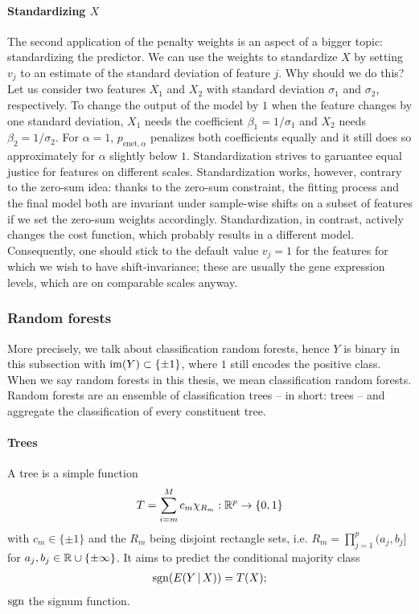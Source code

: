 \paragraph{Standardizing $X$} 
The second application of the penalty weights is an aspect of a bigger topic: standardizing the
predictor. We can use the weights to standardize $X$ by setting $v_j$ to an estimate of the standard 
deviation of feature $j$. Why 
should we do this? Let us consider two features $X_1$ and $X_2$ with standard deviation $\sigma_1$
and $\sigma_2$, respectively. To change the output of the model by $1$ when the feature changes by 
one standard deviation, $X_1$ needs the coefficient $\beta_1 = 1/\sigma_1$ and $X_2$ needs 
$\beta_2 = 1/\sigma_2$. For $\alpha = 1$, $p_{\text{enet}, \alpha}$ penalizes both coefficients 
equally and it still does so approximately for $\alpha$ slightly below $1$. Standardization strives 
to garuantee equal justice for features on different scales.
Standardization works, however, contrary to the zero-sum idea: thanks to the zero-sum constraint, 
the fitting process and the final model both are invariant under sample-wise shifts on a subset of 
features if we set the zero-sum weights accordingly. Standardization, in contrast, actively changes 
the cost function, which probably results in a different model. Consequently, one should stick to 
the default value $v_j = 1$ for the features for which we wish to have shift-invariance; these 
are usually the gene expression levels, which are on comparable scales anyway.

\subsubsection{Random forests}

More precisely, we talk about classification random forests, hence $Y$ is binary in this subsection 
with $\mathrm{im}(Y) \subset \{ \pm 1 \}$, where $1$ still encodes the positive class. When we say random 
forests in this thesis, we mean classification 
random forests. Random forests are an ensemble of classification trees -- in short: 
trees -- and aggregate the classification of every constituent tree.

\paragraph{Trees}
A tree is a simple function
\begin{align}
    T = \sum_{i=m}^M c_m \chi_{R_m}: \mathbb{R}^p \to \{0, 1\}
\end{align}
with $c_m \in \{\pm 1\}$ and the $R_m$ being disjoint rectangle sets, i.e. $R_m = \prod_{j=1}^p 
(a_j, b_j]$ for $a_j, b_j \in \mathbb{R} \cup \{ \pm \infty \}$. It aims to predict the conditional 
majority class 
\begin{align}\label{eq:rf-major}
    \mathrm{sgn}(E(Y \,|\, X)) = T(X);
\end{align}
$\mathrm{sgn}$ the signum function.

